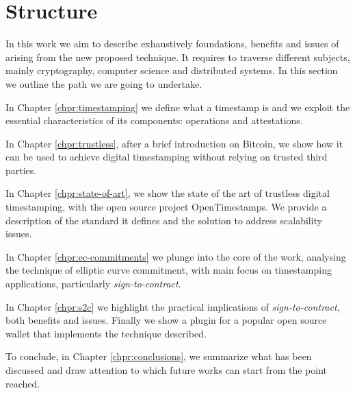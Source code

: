 \section{Structure}
In this work we aim to describe exhaustively foundations, benefits and issues of arising from the new proposed technique. 
It requires to traverse different subjects, mainly cryptography, computer science and distributed systems.
In this section we outline the path we are going to undertake.

In Chapter \ref{chpr:timestamping} we define what a timestamp is and we exploit the essential characteristics of its components: operations and attestations.

In Chapter \ref{chpr:trustless}, after a brief introduction on Bitcoin, we show how it can be used to achieve digital timestamping without relying on trusted third parties.

In Chapter \ref{chpr:state-of-art}, we show the state of the art of trustless digital timestamping, with the open source project OpenTimestamps. 
We provide a description of the standard it defines and the solution to address scalability issues.

In Chapter \ref{chpr:ec-commitments} we plunge into the core of the work, analysing the technique of elliptic curve commitment, with main focus on timestamping applications, particularly \textit{sign-to-contract}.

In Chapter \ref{chpr:s2c} we highlight the practical implications of \textit{sign-to-contract}, both benefits and issues. Finally we show a plugin for a popular open source wallet that implements the technique described.

To conclude, in Chapter \ref{chpr:conclusions}, we summarize what has been discussed and draw attention to which future works can start from the point reached.
